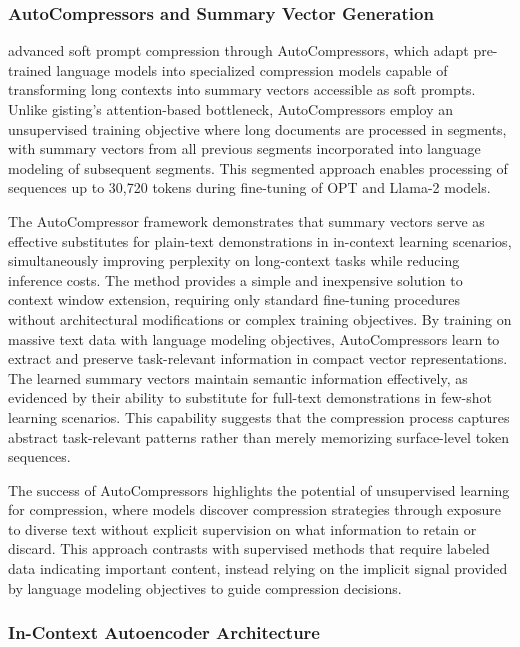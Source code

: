 \documentclass[11pt,letterpaper]{article}
\begin{document}
\subsubsection{AutoCompressors and Summary Vector Generation}

\cite{chevalier2023adapting} advanced soft prompt compression through AutoCompressors, which adapt pre-trained language models into specialized compression models capable of transforming long contexts into summary vectors accessible as soft prompts. Unlike gisting's attention-based bottleneck, AutoCompressors employ an unsupervised training objective where long documents are processed in segments, with summary vectors from all previous segments incorporated into language modeling of subsequent segments. This segmented approach enables processing of sequences up to 30,720 tokens during fine-tuning of OPT and Llama-2 models.

The AutoCompressor framework demonstrates that summary vectors serve as effective substitutes for plain-text demonstrations in in-context learning scenarios, simultaneously improving perplexity on long-context tasks while reducing inference costs. The method provides a simple and inexpensive solution to context window extension, requiring only standard fine-tuning procedures without architectural modifications or complex training objectives. By training on massive text data with language modeling objectives, AutoCompressors learn to extract and preserve task-relevant information in compact vector representations. The learned summary vectors maintain semantic information effectively, as evidenced by their ability to substitute for full-text demonstrations in few-shot learning scenarios. This capability suggests that the compression process captures abstract task-relevant patterns rather than merely memorizing surface-level token sequences.

The success of AutoCompressors highlights the potential of unsupervised learning for compression, where models discover compression strategies through exposure to diverse text without explicit supervision on what information to retain or discard. This approach contrasts with supervised methods that require labeled data indicating important content, instead relying on the implicit signal provided by language modeling objectives to guide compression decisions.

\subsubsection{In-Context Autoencoder Architecture}
\end{document}
